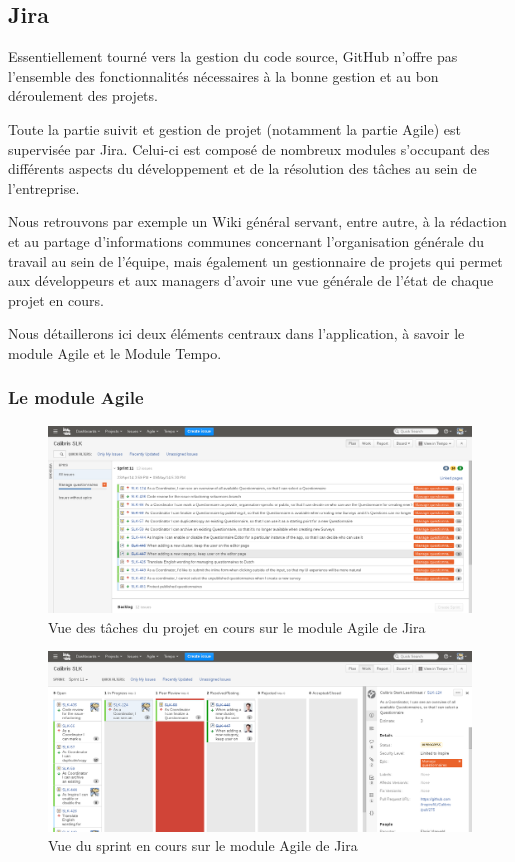 \documentclass[12pt,a4paper]{book}
\begin{document}
\subsection{Jira}

Essentiellement tourné vers la gestion du code source, GitHub n'offre pas l'ensemble des fonctionnalités nécessaires à la bonne gestion et au bon déroulement des projets.

Toute la partie suivit et gestion de projet (notamment la partie Agile) est supervisée par Jira. Celui-ci est composé de nombreux modules s'occupant des différents aspects du développement et de la résolution des tâches au sein de l'entreprise.

Nous retrouvons par exemple un Wiki général servant, entre autre, à la rédaction et au partage d'informations communes concernant l'organisation générale du travail au sein de l'équipe, mais également un gestionnaire de projets qui permet aux développeurs et aux managers d'avoir une vue générale de l'état de chaque projet en cours.

Nous détaillerons ici deux éléments centraux dans l'application, à savoir le module Agile et le Module Tempo.

\subsubsection{Le module Agile}

\begin{figure}[htp]
\centering
\includegraphics[scale=.30]{img/jira_agile_1.png}
 \caption{Vue des tâches du projet en cours sur le module Agile de Jira}
 \label{fig.jira_agile1}
\end{figure}

\begin{figure}[htp]
\centering
\includegraphics[scale=.30]{img/jira_agile_2.png}
 \caption{Vue du sprint en cours sur le module Agile de Jira}
 \label{fig.jira_agile2}
\end{figure}
\end{document}
